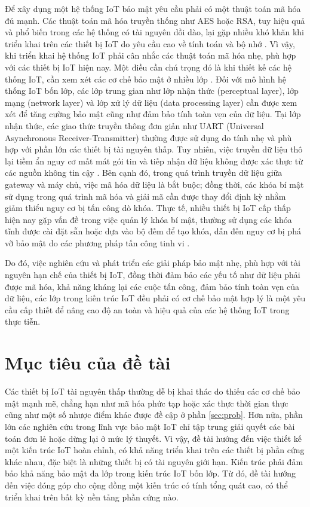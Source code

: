 Để xây dụng một hệ thống IoT bảo mật yêu cầu phải có một thuật toán mã hóa đủ mạnh. Các thuật toán mã hóa truyền thống như AES hoặc RSA, tuy hiệu quả và phổ biến trong các hệ thống có tài nguyên dồi dào, lại gặp nhiều khó khăn khi triển khai trên các thiết bị IoT do yêu cầu cao về tính toán và bộ nhớ \cite{iot3}. Vì vậy, khi triển khai hệ thống IoT phải cân nhắc các thuật toán mã hóa nhẹ, phù hợp với các thiết bị IoT hiện nay. Một điều cần chú trọng đó là khi thiết kế các hệ thống IoT, cần xem xét các cơ chế bảo mật ở nhiều lớp \cite{iot4}. Đối với mô hình hệ thống IoT bốn lớp, các lớp trung gian như lớp nhận thức (perceptual layer), lớp mạng (network layer) và lớp xử lý dữ liệu (data processing layer) cần được xem xét để tăng cường bảo mật cũng như đảm bảo tính toàn vẹn của dữ liệu. Tại lớp nhận thức, các giao thức truyền thông đơn giản như UART (Universal Asynchronous Receiver-Transmitter) thường được sử dụng do tính nhẹ và phù hợp với phần lớn các thiết bị tài nguyên thấp. Tuy nhiên, việc truyền dữ liệu thô lại tiềm ẩn nguy cơ mất mát gói tin và tiếp nhận dữ liệu không được xác thực từ các nguồn không tin cậy \cite{iot5}. Bên cạnh đó, trong quá trình truyền dữ liệu giữa gateway và máy chủ, việc mã hóa dữ liệu là bắt buộc; đồng thời, các khóa bí mật sử dụng trong quá trình mã hóa và giải mã cần được thay đổi định kỳ nhằm giảm thiểu nguy cơ bị tấn công dò khóa. Thực tế, nhiều thiết bị IoT cấp thấp hiện nay gặp vấn đề trong việc quản lý khóa bí mật, thường sử dụng các khóa tĩnh được cài đặt sẵn hoặc dựa vào bộ đếm để tạo khóa, dẫn đến nguy cơ bị phá vỡ bảo mật do các phương pháp tấn công tinh vi \cite{iot6}.

Do đó, việc nghiên cứu và phát triển các giải pháp bảo mật nhẹ, phù hợp với tài nguyên hạn chế của thiết bị IoT, đồng thời đảm bảo các yếu tố như dữ liệu phải được mã hóa, khả năng kháng lại các cuộc tấn công, đảm bảo tính toàn vẹn của dữ liệu, các lớp trong kiến trúc IoT đều phải có cơ chế bảo mật hợp lý là một yêu cầu cấp thiết để nâng cao độ an toàn và hiệu quả của các hệ thống IoT trong thực tiễn.

\section{Mục tiêu của đề tài}
Các thiết bị IoT tài nguyên thấp thường dễ bị khai thác do thiếu các cơ chế bảo mật mạnh mẽ, chẳng hạn như mã hóa phức tạp hoặc xác thực thời gian thực cũng như một số nhược điểm khác
được đề cập ở phần \ref{sec:prob}. 
Hơn nữa, phần lớn các nghiên cứu trong lĩnh vực bảo mật IoT chỉ tập trung giải quyết các bài toán đơn lẻ hoặc dừng lại ở mức lý thuyết. Vì vậy, đề tài hướng đến việc thiết kế một kiến trúc IoT hoàn chỉnh, có khả năng triển khai trên các thiết bị phần cứng khác nhau, đặc biệt là những thiết bị có tài nguyên giới hạn. Kiến trúc phải 
đảm bảo khả năng bảo mật đa lớp trong kiến trúc IoT bốn lớp. Từ đó, đề tài hướng đến việc đóng góp cho cộng đồng một kiến trúc có tính tổng quát cao, có thể triển khai trên bất kỳ nền tảng phần cứng nào.

